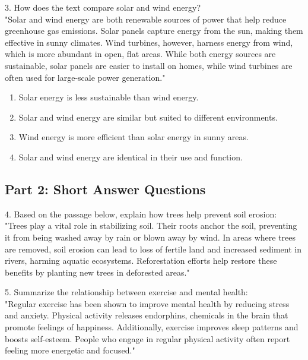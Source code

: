 \documentclass[12pt]{article}
\begin{document}
\vspace{1cm}

3. How does the text compare solar and wind energy?\\
"Solar and wind energy are both renewable sources of power that help reduce \\greenhouse gas emissions. Solar panels capture energy from the sun, making them effective in sunny climates. Wind turbines, however, harness energy from wind, which is more abundant in open, flat areas. While both energy sources are sustainable, solar panels are easier to install on homes, while wind turbines are often used for large-scale power generation."\\
\begin{enumerate}[label=\Alph*.]
    \item Solar energy is less sustainable than wind energy.  
    \item Solar and wind energy are similar but suited to different environments.  
    \item Wind energy is more efficient than solar energy in sunny areas.  
    \item Solar and wind energy are identical in their use and function.  
\end{enumerate}




\subsection*{Part 2: Short Answer Questions}

4. Based on the passage below, explain how trees help prevent soil erosion: \\
"Trees play a vital role in stabilizing soil. Their roots anchor the soil, preventing it from being washed away by rain or blown away by wind. In areas where trees are removed, soil erosion can lead to loss of fertile land and increased sediment in rivers, harming aquatic ecosystems. Reforestation efforts help restore these benefits by planting new trees in deforested areas."\\
\vspace{3cm}

5. Summarize the relationship between exercise and mental health: \\
"Regular exercise has been shown to improve mental health by reducing stress and anxiety. Physical activity releases endorphins, chemicals in the brain that promote feelings of happiness. Additionally, exercise improves sleep patterns and boosts self-esteem. People who engage in regular physical activity often report feeling more energetic and focused."\\
\vspace{4cm}
\end{document}
